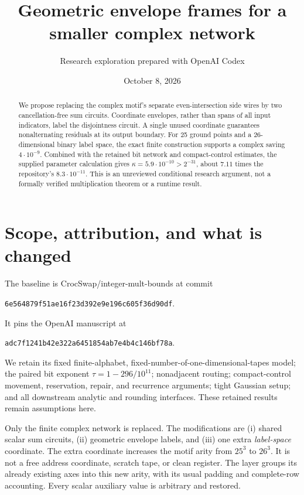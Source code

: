 \documentclass[11pt]{article}
\title{Geometric envelope frames for a smaller complex network}
\author{Research exploration prepared with OpenAI Codex}
\date{October 8, 2026}
\begin{document}
\maketitle
\begin{abstract}
We propose replacing the complex motif's separate even-intersection side
wires by two cancellation-free sum circuits. Coordinate envelopes, rather
than spans of all input indicators, label the disjointness circuit. A single
unused coordinate guarantees nonalternating residuals at its output boundary.
For 25 ground points and a 26-dimensional binary label space, the exact finite
construction supports a complex saving $4\cdot10^{-9}$. Combined with the
retained bit network and compact-control estimates, the supplied parameter
calculation gives $\kappa=5.9\cdot10^{-10}>2^{-31}$, about $7.11$ times the
repository's $8.3\cdot10^{-11}$. This is an unreviewed conditional research
argument, not a formally verified multiplication theorem or a runtime result.
\end{abstract}

\section{Scope, attribution, and what is changed}
The baseline is CrocSwap/integer-mult-bounds at commit
\begin{center}\texttt{6e564879f51ae16f23d392e9e196c605f36d90df}.\end{center}
It pins the OpenAI manuscript at
\begin{center}\texttt{adc7f1241b42e322a6451854ab7e4b4c146bf78a}.\end{center}
We retain its fixed finite-alphabet, fixed-number-of-one-dimensional-tapes
model; the paired bit exponent $\tau=1-296/10^{11}$; nonadjacent routing;
compact-control movement, reservation, repair, and recurrence arguments;
tight Gaussian setup; and all downstream analytic and rounding interfaces.
These retained results remain assumptions here.

Only the finite complex network is replaced. The modifications are
(i) shared scalar sum circuits, (ii) geometric envelope labels, and
(iii) one extra \emph{label-space} coordinate. The extra coordinate increases
the motif arity from $25^3$ to $26^3$. It is not a free address coordinate,
scratch tape, or clean register. The layer groups its already existing axes
into this new arity, with its usual padding and complete-row accounting.
Every scalar auxiliary value is arbitrary and restored.
\end{document}
